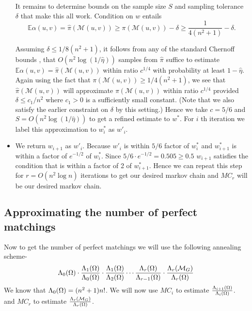 \begin{itemize}
\begin{flushleft}
	It remains to determine bounds on the sample size $S$ and sampling tolerance $\delta$ that make this all work. Condition on $w$ entails
	$$
	\mathbb{E} \alpha(u, v)=\hat{\pi}(\mathcal{M}(u, v)) \geq \pi(\mathcal{M}(u, v))-\delta \geq \frac{1}{4\left(n^2+1\right)}-\delta .
	$$
	
	Assuming $\delta \leq 1 / 8\left(n^2+1\right)$, it follows from any of the standard Chernoff bounds , that $O\left(n^2 \log (1 / \hat{\eta})\right)$ samples from $\hat{\pi}$ suffice to estimate $\mathbb{E} \alpha(u, v)=\hat{\pi}(\mathcal{M}(u, v))$ within ratio $c^{1 / 4}$ with probability at least $1-\hat{\eta}$. Again using the fact that $\pi(\mathcal{M}(u, v)) \geq 1 / 4\left(n^2+1\right)$, we see that $\hat{\pi}(\mathcal{M}(u, v))$ will approximate $\pi(\mathcal{M}(u, v))$ within ratio $c^{1 / 4}$ provided $\delta \leq c_1 / n^2$ where $c_1>0$ is a sufficiently small constant. (Note that we also satisfy the earlier constraint on $\delta$ by this setting.) Hence we take $c=5/6$ and $S=O\left(n^2 \log (1 / \hat{\eta})\right)$ to get a refined estimate to $w^*$. For $i$ th iteration we label this approximation to $w^*_i$ as $w'_i$.
\end{flushleft}
\item \begin{flushleft}
	We return $w_{i+1} $ as $w'_i$. Because $w'_i$ is within $5/6$ factor of $w^*_i$ and $w_{i+1}^* $ is within a factor of $e^{-1/2}$ of $w^*_i$. Since $5/6\cdot e^{-1/2}=0.505\geq 0.5$ $w_{i+1}$ satisfies the condition that is within a factor of 2 of $w^*_{i+1}$. Hence we can repeat this step for $r=O(n^2 \log n)$ iterations to get our desired markov chain and $MC_r$ will be our desired markov chain.
\end{flushleft}

\end{itemize}

\subsection{Approximating the number of perfect matchings}
\begin{flushleft}
	Now to get the number of perfect matchings we will use the following annealing scheme-
	$$\Lambda_0(\Omega)\cdot\frac{\Lambda_1(\Omega)}{\Lambda_0(\Omega)}\cdot\frac{\Lambda_1(\Omega)}{\Lambda_2(\Omega)}\cdots \frac{\Lambda_{r}(\Omega)}{\Lambda_{r-1}(\Omega)}\cdot
	\frac{\Lambda_r(\mathcal{M}_G)}{\Lambda_r(\Omega)}$$
	We know that $\Lambda_0(\Omega) = (n^2+1)n!$. We will now use $MC_i$ to estimate $\frac{\Lambda_{i+1}(\Omega)}{\Lambda_i(\Omega)}$.\\
	and $MC_r$ to estimate $\frac{\Lambda_r(\mathcal{M}_G)}{\Lambda_r(\Omega)}$.
\end{flushleft}
